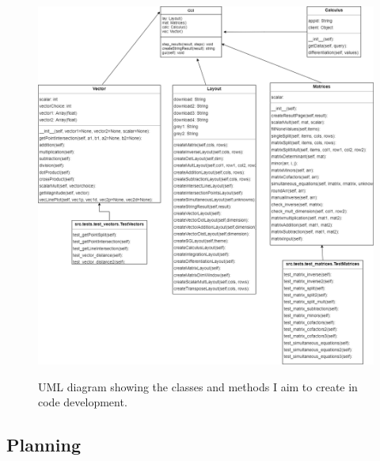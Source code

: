 \documentclass[final]{cmpreport}
\begin{document}
	\begin{figure}[H]
		\caption{UML diagram showing the classes and methods I aim to create in code development.}
		\centering
		\includegraphics[scale=0.4]{UML.png}
		\label{fig:uml}
	\end{figure}
	\subsection{Planning} \label{sec:planning}
	
\end{document}
